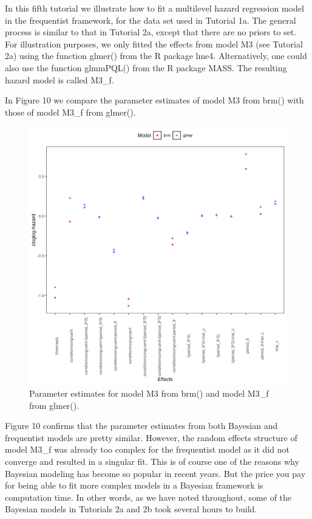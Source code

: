 \documentclass[
  man,floatsintext]{apa6}
\begin{document}
In this fifth tutorial we illustrate how to fit a multilevel hazard regression model in the frequentist framework, for the data set used in Tutorial 1a. The general process is similar to that in Tutorial 2a, except that there are no priors to set. For illustration purposes, we only fitted the effects from model M3 (see Tutorial 2a) using the function glmer() from the R package lme4. Alternatively, one could also use the function glmmPQL() from the R package MASS. The resulting hazard model is called M3\_f.

In Figure 10 we compare the parameter estimates of model M3 from brm() with those of model M3\_f from glmer().



\begin{figure}[H]

{\centering \includegraphics[width=0.8\linewidth,height=0.67\textheight,]{../Tutorial_3_Frequentist/comparison} 

}

\caption{Parameter estimates for model M3 from brm() and model M3\_f from glmer().}\label{fig:plot-comparison}
\end{figure}

Figure 10 confirms that the parameter estimates from both Bayesian and frequentist models are pretty similar. However, the random effects structure of model M3\_f was already too complex for the frequentist model as it did not converge and resulted in a singular fit. This is of course one of the reasons why Bayesian modeling has become so popular in recent years. But the price you pay for being able to fit more complex models in a Bayesian framework is computation time. In other words, as we have noted throughout, some of the Bayesian models in Tutorials 2a and 2b took several hours to build.
\end{document}
